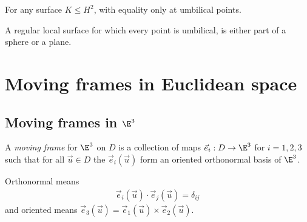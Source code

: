 \documentclass{article}
\begin{document}
\begin{lemma}[Notes 9.22]
	For any surface $K\leq H^2$, with equality only at umbilical points.
\end{lemma}

\begin{theorem}[Notes 9.23]
	A regular local surface for which every point is umbilical, is either part of a sphere
	or a plane.
\end{theorem}

\section{Moving frames in Euclidean space}

\subsection{Moving frames in $\E^3$}

\begin{definition}
	A \emph{moving frame} for $\E^3$ on $D$ is a collection of maps $\vec e_i:D\to\E^3$
	for $i=1,2,3$ such that for all $\vec u\in D$ the $\vec e_i(\vec u)$ form an oriented orthonormal
	basis of $\E^3$.

	Orthonormal means
	\begin{align*}
		\vec e_i(\vec u) \cdot \vec e_j(\vec u) = \delta_{ij}
	\end{align*}
	and oriented means $\vec e_3(\vec u) = \vec e_1(\vec u) \times \vec e_2(\vec u)$.
\end{definition}
\end{document}
